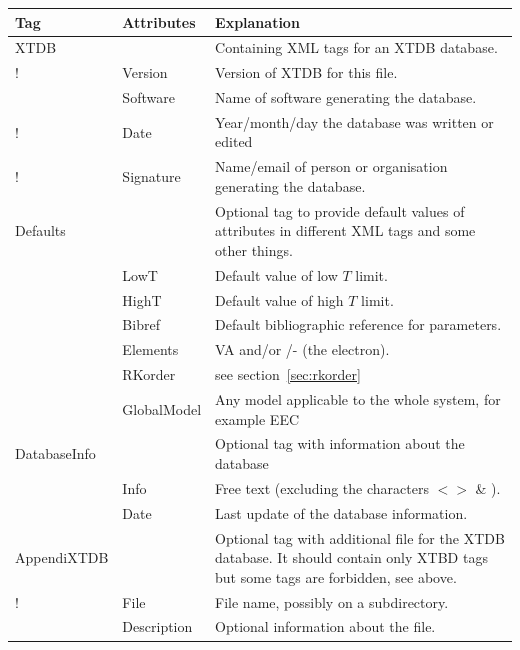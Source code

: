 \documentclass{article}
\begin{document}
\begin{tabular}{|p{} p{} p{}|}\hline
  Tag & Attributes & Explanation\\\hline

  XTDB    &         & Containing XML tags for an XTDB database.\\
!          & Version & Version of XTDB for this file.\\
           &Software & Name of software generating the database.\\
!          &Date     & Year/month/day the database was written or edited\\
!          &Signature & Name/email of person or organisation generating the database.\\\hline
  
  Defaults & & Optional tag to provide default values of attributes in
                 different XML tags and some other things.\\
           & LowT & Default value of low $T$ limit.\\
           & HighT & Default value of high $T$ limit.\\
           & Bibref & Default bibliographic reference for parameters. \\
           & Elements & VA and/or /- (the electron).\\
           & RKorder & see section~\ref{sec:rkorder} \\
           & GlobalModel & Any model applicable to the whole system,
                 for example EEC\\\hline

  DatabaseInfo & & Optional tag with information about the database\\
           & Info & Free text (excluding the characters $< >$ \& ).\\
           & Date & Last update of the database information.\\\hline

  AppendiXTDB & & Optional tag with additional file for the XTDB database.  
              It should contain only XTBD tags but some tags are forbidden,
              see above.\\
!              & File & File name, possibly on a subdirectory.\\
              & Description & Optional information about the file.\\\hline
\end{tabular}
\end{document}
